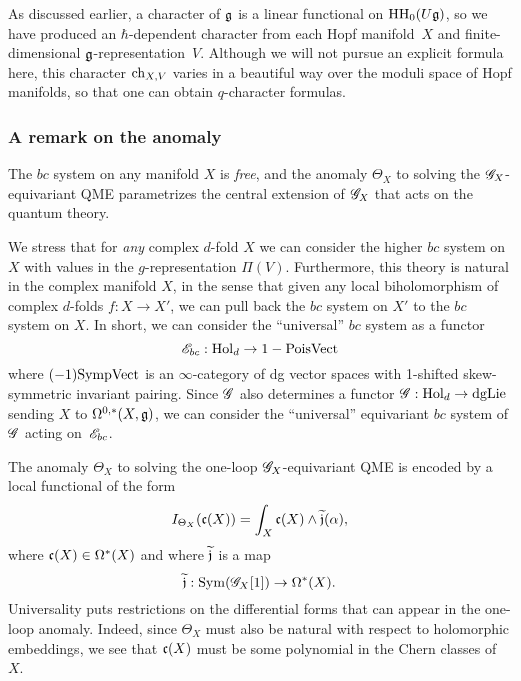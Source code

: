 As discussed earlier, a character of $\mathfrak g$ is a linear functional on ${\rm HH}_0(U \mathfrak g)$,
so we have produced an $\hbar$-dependent character from each Hopf manifold~$X$ and finite-dimensional $\mathfrak g$-representation~$V$.
Although we will not pursue an explicit formula here, 
this character ${\rm ch}_{X,V}$ varies in a beautiful way over the moduli space of Hopf manifolds,
so that one can obtain $q$-character formulas.


\subsubsection{A remark on the anomaly}\label{sec: hopfobs}

The $bc$ system on any manifold $X$ is {\em free}, and the anomaly $\Theta_X$ to solving the $\mathscr G_X$-equivariant QME parametrizes the central extension of $\mathscr G_X$ that acts on the quantum theory.


We stress that for {\em any} complex $d$-fold $X$ we can consider the higher $bc$ system on $X$ with values in the $g$-representation $\Pi(V)$. 
Furthermore, this theory is natural in the complex manifold $X$, in the sense that given any local biholomorphism of complex $d$-folds $f : X \to X'$, 
we can pull back the $bc$ system on $X'$ to the $bc$ system on $X$. 
In short, we can consider the ``universal'' $bc$ system as a functor
\[
\mathscr E_{bc} : {\rm Hol}_d \to 1-{\rm PoisVect}
\]
where $(-1){\rm SympVect}$ is an $\infty$-category of dg vector spaces with 1-shifted skew-symmetric invariant pairing. 
Since $\mathscr G$ also determines a functor $\mathscr G: {\rm Hol}_d \to {\rm dgLie}$ sending $X$ to $\Omega^{0,*}(X, \mathfrak g)$, we can consider the ``universal'' equivariant $bc$ system of $\mathscr G$ acting on~$\mathscr E_{bc}$. 

The anomaly $\Theta_X$ to solving the one-loop $\mathscr G_X$-equivariant QME is encoded by a local functional of the form
\[
I_{\Theta_X}(\mathfrak c(X))=\int_X \mathfrak c(X) \wedge \widetilde{\mathfrak j}(\alpha),
\]
where $\mathfrak c(X) \in \Omega^*(X)$ and where $\widetilde{\mathfrak j}$ is a map
\[
\widetilde{\mathfrak j} : {\rm Sym}(\mathscr G_X[1]) \to \Omega^*(X) .
\]
Universality puts restrictions on the differential forms that can appear in the one-loop anomaly. 
Indeed, since $\Theta_X$ must also be natural with respect to holomorphic embeddings, we see that $\mathfrak c(X)$ must be some polynomial in the Chern classes of~$X$. 

